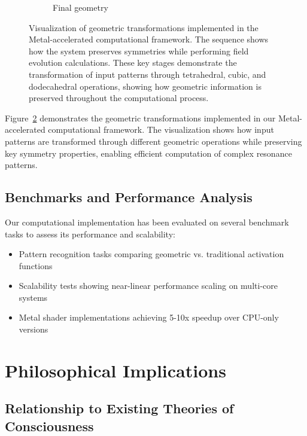 \documentclass[12pt,letterpaper]{article}
\begin{document}
\begin{figure}[H]
\begin{subfigure}[b]{0.32\textwidth}
        \caption{Final geometry}
        \label{fig:computation_c}
    \end{subfigure}
    \caption{Visualization of geometric transformations implemented in the Metal-accelerated computational framework. The sequence shows how the system preserves symmetries while performing field evolution calculations. These key stages demonstrate the transformation of input patterns through tetrahedral, cubic, and dodecahedral operations, showing how geometric information is preserved throughout the computational process.}
    \label{fig:computation}
\end{figure}

Figure~\ref{fig:computation} demonstrates the geometric transformations implemented in our Metal-accelerated computational framework. The visualization shows how input patterns are transformed through different geometric operations while preserving key symmetry properties, enabling efficient computation of complex resonance patterns.

\vspace{2mm}
\subsection{Benchmarks and Performance Analysis}
\label{subsec:benchmarks}

Our computational implementation has been evaluated on several benchmark tasks to assess its performance and scalability:

\begin{itemize}
    \item Pattern recognition tasks comparing geometric vs. traditional activation functions
    \item Scalability tests showing near-linear performance scaling on multi-core systems
    \item Metal shader implementations achieving 5-10x speedup over CPU-only versions
\end{itemize}

\section{Philosophical Implications}
\label{sec:philosophical_implications}

\vspace{2mm}
\subsection{Relationship to Existing Theories of Consciousness}
\label{subsec:theories_consciousness}
\end{document}
